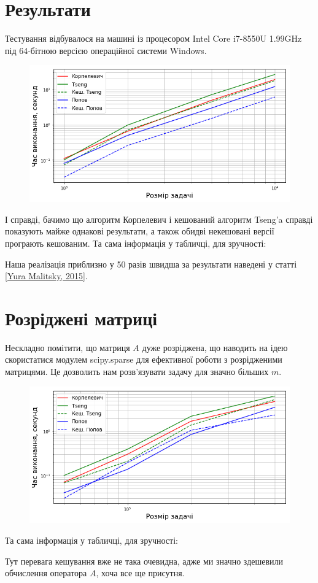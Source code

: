 \section{Результати}

Тестування відбувалося на машині із процесором Intel Core i7-8550U 1.99GHz під 64-бітною версією операційної системи Windows.

\begin{figure}[H]
    \centering
    \includegraphics[width=.75\textwidth]{img/1/time.png}
\end{figure}

І справді, бачимо що алгоритм Корпелевич і кешований алгоритм Tseng'a справді показують майже однакові результати, а також обидві некешовані версії програють кешованим. Та сама інформація у табличці, для зручності:





\begin{remark}
    Наша реалізація приблизно у 50 разів швидша за результати наведені у статті \href{https://arxiv.org/abs/1502.04968v1}{[Yura Malitsky, 2015]}. 
\end{remark}

\section{Розріджені матриці}

Нескладно помітити, що матриця $A$ дуже розріджена, що наводить на ідею скористатися модулем scipy.sparse для ефективної роботи з розрідженими матрицями. Це дозволить нам розв'язувати задачу для значно більших $m$.

\begin{figure}[H]
    \centering
    \includegraphics[width=.75\textwidth]{img/1/sparse/time.png}
\end{figure}

Та сама інформація у табличці, для зручності:





\begin{remark}
    Тут перевага кешування вже не така очевидна, адже ми значно здешевили обчислення оператора $A$, хоча все ще присутня.
\end{remark}
